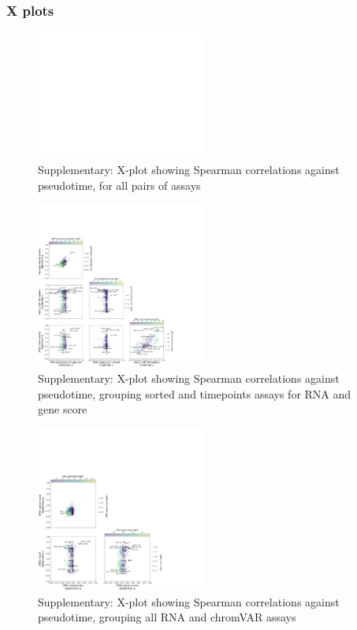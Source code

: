 \documentclass[a4paper]{article}
\begin{document}
\FloatBarrier
\subsubsection{X plots}
 
\begin{figure}[!htb]
  \centering
  \includegraphics[width=0.5\textwidth]{../figures/hematopoiesis/Neutrophil_40_106_smooth_none_detailed_X_plot.png}
  \caption{Supplementary: X-plot showing Spearman correlations against pseudotime, for all pairs of assays}
\end{figure}

\begin{figure}[!htb]
  \centering
  \includegraphics[width=0.5\textwidth]{../figures/hematopoiesis/Neutrophil_40_106_smooth_none_semi_detailed_X_plot.png}
  \caption{Supplementary: X-plot showing Spearman correlations against pseudotime, grouping sorted and timepoints assays for RNA and gene score}
\end{figure}

\begin{figure}[!htb]
  \centering
  \includegraphics[width=0.5\textwidth]{../figures/hematopoiesis/Neutrophil_40_106_smooth_none_grouped_X_plot.png}
  \caption{Supplementary: X-plot showing Spearman correlations against pseudotime, grouping all RNA and chromVAR assays}
\end{figure}
\end{document}
